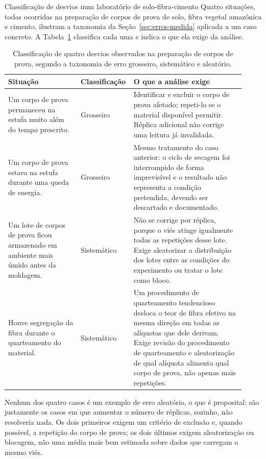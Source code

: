 \documentclass{doeapostila}
\begin{document}
\begin{aplicacao}{Classificação de desvios num laboratório de solo-fibra-cimento}
  Quatro situações, todas ocorridas na preparação de corpos de prova de
  solo, fibra vegetal amazônica e cimento, ilustram a taxonomia da
  Seção~\ref{sec:erros-medida} aplicada a um caso concreto. A
  Tabela~\ref{tab:classificacao-erros} classifica cada uma e indica o que
  ela exige da análise.

  \begin{table}[H]
    \centering
    \caption{Classificação de quatro desvios observados na preparação de
      corpos de prova, segundo a taxonomia de erro grosseiro, sistemático e
      aleatório.}
    \label{tab:classificacao-erros}
    \begin{tabular}{p{0.30\linewidth} p{0.16\linewidth} p{0.46\linewidth}}
      \toprule
      \textbf{Situação} & \textbf{Classificação} & \textbf{O que a análise exige} \\
      \midrule
      Um corpo de prova permaneceu na estufa muito além do tempo
      prescrito. &
      Grosseiro &
      Identificar e excluir o corpo de prova afetado; repeti-lo se o
      material disponível permitir. Réplica adicional não corrige uma
      leitura já invalidada. \\
      \addlinespace
      Um corpo de prova estava na estufa durante uma queda de energia. &
      Grosseiro &
      Mesmo tratamento do caso anterior: o ciclo de secagem foi
      interrompido de forma imprevisível e o resultado não representa a
      condição pretendida, devendo ser descartado e documentado. \\
      \addlinespace
      Um lote de corpos de prova ficou armazenado em ambiente mais úmido
      antes da moldagem. &
      Sistemático &
      Não se corrige por réplica, porque o viés atinge igualmente todas as
      repetições desse lote. Exige aleatorizar a distribuição dos lotes
      entre as condições do experimento ou tratar o lote como bloco. \\
      \addlinespace
      Houve segregação da fibra durante o quarteamento do material. &
      Sistemático &
      Um procedimento de quarteamento tendencioso desloca o teor de fibra
      efetivo na mesma direção em todas as alíquotas que dele derivam.
      Exige revisão do procedimento de quarteamento e aleatorização de qual
      alíquota alimenta qual corpo de prova, não apenas mais repetições. \\
      \bottomrule
    \end{tabular}
  \end{table}

  Nenhum dos quatro casos é um exemplo de erro aleatório, o que é
  proposital: são justamente os casos em que aumentar o número de réplicas,
  sozinho, não resolveria nada. Os dois primeiros exigem um critério de
  exclusão e, quando possível, a repetição do corpo de prova; os dois
  últimos exigem aleatorização ou blocagem, não uma média mais bem estimada
  sobre dados que carregam o mesmo viés.
\end{aplicacao}
\end{document}
